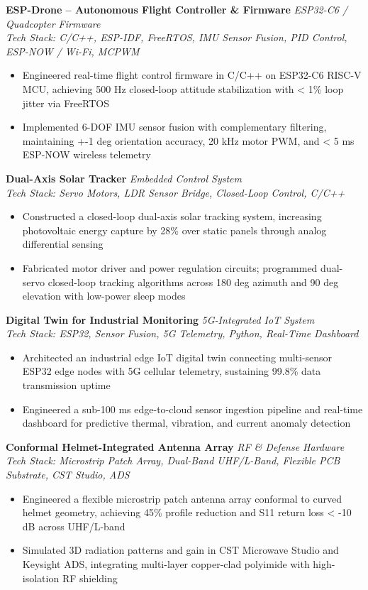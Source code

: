 \documentclass[a4paper,9pt]{extarticle}
\newcommand{\resumeItem}[1]{\item #1}
\newenvironment{resumeItemize}{\begin{itemize}[leftmargin=12pt, itemsep=0.2pt, parsep=0pt, topsep=0.4pt, partopsep=0pt]}{\end{itemize}}
\newcommand{\resumeProject}[3]{
  \textbf{#1} \hfill \textit{#2} \\
  \textit{Tech Stack: #3}
}
\begin{document}
\resumeProject{ESP-Drone -- Autonomous Flight Controller \& Firmware}{ESP32-C6 / Quadcopter Firmware}{C/C++, ESP-IDF, FreeRTOS, IMU Sensor Fusion, PID Control, ESP-NOW / Wi-Fi, MCPWM}
\begin{resumeItemize}
    \resumeItem{Engineered real-time flight control firmware in C/C++ on ESP32-C6 RISC-V MCU, achieving 500 Hz closed-loop attitude stabilization with < 1\% loop jitter via FreeRTOS}
    \resumeItem{Implemented 6-DOF IMU sensor fusion with complementary filtering, maintaining +-1 deg orientation accuracy, 20 kHz motor PWM, and < 5 ms ESP-NOW wireless telemetry}
\end{resumeItemize}
\vspace{0.8pt}

\resumeProject{Dual-Axis Solar Tracker}{Embedded Control System}{Servo Motors, LDR Sensor Bridge, Closed-Loop Control, C/C++}
\begin{resumeItemize}
    \resumeItem{Constructed a closed-loop dual-axis solar tracking system, increasing photovoltaic energy capture by 28\% over static panels through analog differential sensing}
    \resumeItem{Fabricated motor driver and power regulation circuits; programmed dual-servo closed-loop tracking algorithms across 180 deg azimuth and 90 deg elevation with low-power sleep modes}
\end{resumeItemize}
\vspace{0.8pt}

\resumeProject{Digital Twin for Industrial Monitoring}{5G-Integrated IoT System}{ESP32, Sensor Fusion, 5G Telemetry, Python, Real-Time Dashboard}
\begin{resumeItemize}
    \resumeItem{Architected an industrial edge IoT digital twin connecting multi-sensor ESP32 edge nodes with 5G cellular telemetry, sustaining 99.8\% data transmission uptime}
    \resumeItem{Engineered a sub-100 ms edge-to-cloud sensor ingestion pipeline and real-time dashboard for predictive thermal, vibration, and current anomaly detection}
\end{resumeItemize}
\vspace{0.8pt}

\resumeProject{Conformal Helmet-Integrated Antenna Array}{RF \& Defense Hardware}{Microstrip Patch Array, Dual-Band UHF/L-Band, Flexible PCB Substrate, CST Studio, ADS}
\begin{resumeItemize}
    \resumeItem{Engineered a flexible microstrip patch antenna array conformal to curved helmet geometry, achieving 45\% profile reduction and S11 return loss < -10 dB across UHF/L-band}
    \resumeItem{Simulated 3D radiation patterns and gain in CST Microwave Studio and Keysight ADS, integrating multi-layer copper-clad polyimide with high-isolation RF shielding}
\end{resumeItemize}
\vspace{0.8pt}
\end{document}
